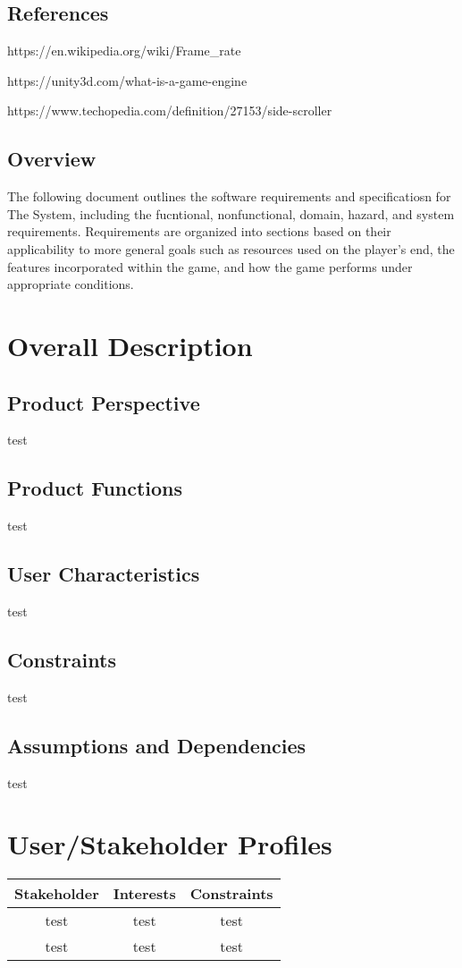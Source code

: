 \documentclass[12pt]{report}
\newenvironment{reqlist}{
	\renewcommand{\labelenumi}{\tab\thesubsection.\arabic{enumi}}
	\renewcommand{\labelenumii}{\thesubsection.\arabic{enumi}.\arabic{enumii}}
	\begin{enumerate}[itemsep = 1pt, parsep = 0pt, leftmargin = *]
}{\end{enumerate}}
\begin{document}
	\subsection{References}
		\begin{reqlist}
			\small{
				\item https://en.wikipedia.org/wiki/Frame\_rate
				\item https://unity3d.com/what-is-a-game-engine
				\item https://www.techopedia.com/definition/27153/side-scroller
			}
		\end{reqlist}
	\subsection{Overview}
		The following document outlines the software requirements and specificatiosn for The System, including the fucntional, nonfunctional, domain, hazard, and system requirements. Requirements are organized into sections based on their applicability to more general goals such as resources used on the player's end, the features incorporated within the game, and how the game performs under appropriate conditions.

\section{Overall Description}
	\subsection{Product Perspective}
		test
	\subsection{Product Functions}
		test
	\subsection{User Characteristics}
		test
	\subsection{Constraints}
		test
	\subsection{Assumptions and Dependencies}
		test

\section{User/Stakeholder Profiles}
\begin{center}
	\begin{tabular}{|c|c|c|} \hline
		\textbf{Stakeholder} & \textbf{Interests} & \textbf{Constraints} \\ \hline
		test & test & test \\ \hline
		test & test & test \\ \hline
	\end{tabular}
\end{center}
\end{document}
